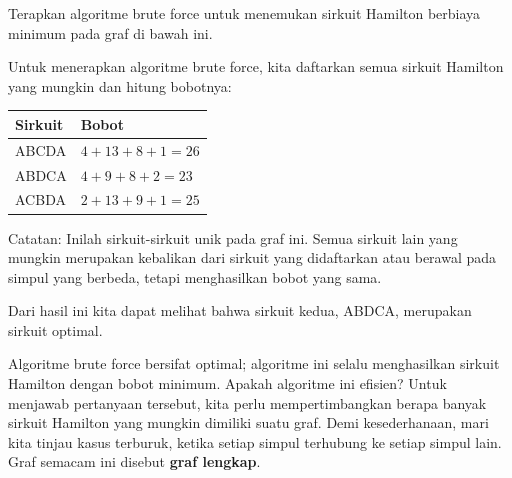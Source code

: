 \begin{example}{} %
Terapkan algoritme brute force untuk menemukan sirkuit Hamilton berbiaya minimum pada graf di bawah ini.\\

\begin{center}
\end{center}

Untuk menerapkan algoritme brute force, kita daftarkan semua sirkuit Hamilton yang mungkin dan hitung bobotnya:
\begin{center}
\begin{tabular}{|l|l|}
\hline
Sirkuit & Bobot\\
\hline 
ABCDA & $4+13+8+1=26$\\
\hline
ABDCA & $4+9+8+2=23$\\
\hline
ACBDA & $2+13+9+1=25$\\
\hline
\end{tabular}
\par{}\label{tab:graphtheory-dor1-tab05}%

\end{center}

Catatan:  Inilah sirkuit-sirkuit unik pada graf ini.  Semua sirkuit lain yang mungkin merupakan kebalikan dari sirkuit yang didaftarkan atau berawal pada simpul yang berbeda, tetapi menghasilkan bobot yang sama.

Dari hasil ini kita dapat melihat bahwa sirkuit kedua, ABDCA, merupakan sirkuit optimal.  
\end{example}

Algoritme brute force bersifat optimal; algoritme ini selalu menghasilkan sirkuit Hamilton dengan bobot minimum.  Apakah algoritme ini efisien?  Untuk menjawab pertanyaan tersebut, kita perlu mempertimbangkan berapa banyak sirkuit Hamilton yang mungkin dimiliki suatu graf.  Demi kesederhanaan, mari kita tinjau kasus terburuk, ketika setiap simpul terhubung ke setiap simpul lain.  Graf semacam ini disebut \textbf{graf lengkap}.

